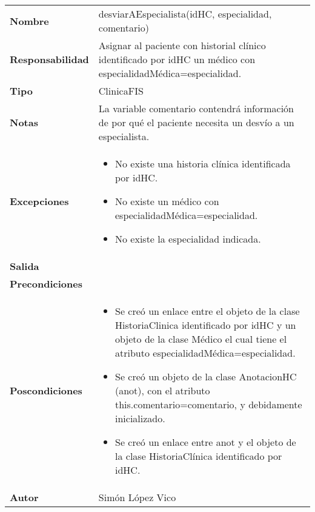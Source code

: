\documentclass[11pt,a4paper]{article}
\begin{document}
\begin{table}[H]
	\centering
	\label{my-label}
	\begin{tabularx}{\textwidth}{l|X}
		\textbf{Nombre}          & desviarAEspecialista(idHC, especialidad, comentario)\\
		\textbf{Responsabilidad} & Asignar al paciente con historial clínico identificado por idHC un médico con especialidadMédica=especialidad.\\
		\textbf{Tipo}            & ClinicaFIS \\
		\textbf{Notas}           & La variable comentario contendrá información de por qué el paciente necesita un desvío a un especialista. \\
		\textbf{Excepciones}     &
		\begin{itemize}
			\item No existe una historia clínica identificada por idHC.
			\item No existe un médico con especialidadMédica=especialidad.
			\item No existe la especialidad indicada.
		\end{itemize} \\
		\textbf{Salida}          &  \\
		\textbf{Precondiciones}  &  \\
		\textbf{Poscondiciones}  &
		\begin{itemize}
			\item Se creó un enlace entre el objeto de la clase HistoriaClinica identificado por idHC y un objeto de la clase Médico el cual tiene el atributo especialidadMédica=especialidad.
			\item Se creó un objeto de la clase AnotacionHC (anot), con el atributo this.comentario=comentario, y debidamente inicializado.
			\item Se creó un enlace entre anot y el objeto de la clase HistoriaClínica identificado por idHC.
		\end{itemize} \\
		\textbf{Autor}			 & Simón López Vico
	\end{tabularx}
\end{table}
\end{document}
